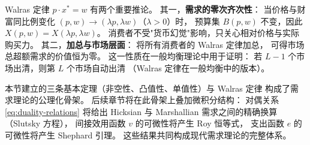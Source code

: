 
\begin{remark}
Walras 定律 $p\cdot x^*=w$ 有两个重要推论。
其一，\textbf{需求的零次齐次性}：
当价格与财富同比例变化 $(p,w)\to(\lambda p,\lambda w)$（$\lambda>0$）时，
预算集 $B(p,w)$ 不变，因此 $X(p,w)=X(\lambda p,\lambda w)$。
消费者不受"货币幻觉"影响，只关心相对价格与实际购买力。
其二，\textbf{加总与市场层面}：
将所有消费者的 Walras 定律加总，
可得市场总超额需求的价值恒为零。
这一性质在一般均衡理论中用于证明：
若 $L-1$ 个市场出清，则第 $L$ 个市场自动出清
（Walras 定律在一般均衡中的版本）。
\end{remark}

\begin{remark}[对偶预告]
本节建立的三条基本定理（非空性、凸值性、单值性）与 Walras 定律
构成了需求理论的公理化骨架。
后续章节将在此骨架上叠加微积分结构：
对偶关系 \eqref{eq:duality-relations} 将给出
Hicksian 与 Marshallian 需求之间的精确换算（Slutsky 方程），
间接效用函数 $v$ 的可微性将产生 Roy 恒等式，
支出函数 $e$ 的可微性将产生 Shephard 引理。
这些结果共同构成现代需求理论的完整体系。
\end{remark}
